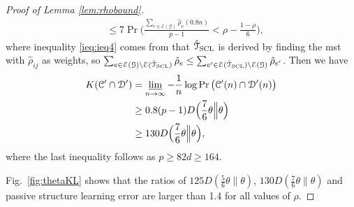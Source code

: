 \documentclass[11pt,onecolumn]{article}
\newcommand{\calC}{\mathcal{C}}
\newcommand{\calD}{\mathcal{D}}
\newcommand{\calE}{\mathcal{E}}
\newcommand{\calG}{\mathcal{G}}
\newcommand{\calT}{\mathcal{T}}
\newcommand{\hatcalT}{\hat{\calT}}
\newcommand{\hrho}{\hat{\rho}}
\begin{document}
\begin{proof}[Proof of Lemma \ref{lem:rhobound}]
\begin{align}
		&\leq 7\Pr\Bigg(\frac{\sum_{e\in\calE(\calG)}\hrho_{e}(0.8n)}{p-1}<\rho-\frac{1-\rho}{6}\Bigg),
	\end{align}
	where inequality \eqref{ieq:ieq4} comes from that $ \hatcalT_{\rm{SCL}}$ is derived by finding the \ac{mst} with $\hrho_{ij}$ as weights, so $\sum_{e\in\calE(\calG)\backslash\calE( \hatcalT_{\rm{SCL}})}\hrho_{e}\leq\sum_{e^{\prime}\in\calE( \hatcalT_{\rm{SCL}})\backslash\calE(\calG)}\hrho_{e^{\prime}}$. 
	Then we have
	\begin{align}
		K (\calC^{\prime}\cap \calD^{\prime})&=\varliminf_{n\rightarrow\infty}-\frac{1}{n}\log\Pr\big( \calC^{\prime}(n)\cap \calD^{\prime}(n)\big)\\
		&\geq 0.8(p-1)D\Big(\frac{7}{6}\theta\Big\|\theta\Big)\\
		&\geq 130 D\Big(\frac{7}{6}\theta\Big\|\theta\Big),
	\end{align}
	where the last inequality follows as $p\geq 82d\geq 164.$

	Fig.~\ref{fig:thetaKL} shows that the ratios of $125D(\frac{5}{6}\theta\|\theta)$, $130D(\frac{7}{6}\theta\|\theta)$ and passive structure learning error are larger than 1.4 for all  values of $\rho$.
\end{proof}
\end{document}
